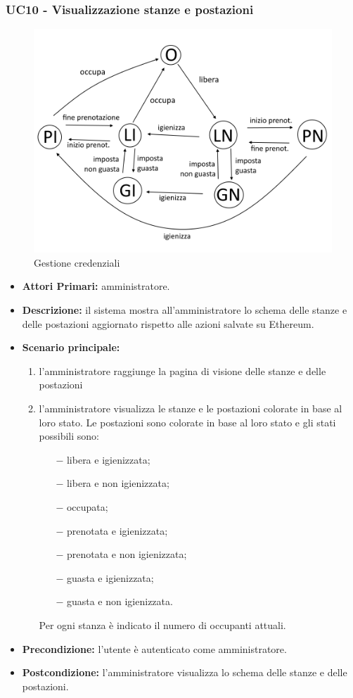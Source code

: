 \subsubsection{ UC10 - Visualizzazione stanze e postazioni}
\begin{figure}[H]
	\centering
	\includegraphics[width=15cm]{res/images/UC10.png}
	\caption{Gestione credenziali}
	\label{fig:stati postazioni}
\end{figure}
\begin{itemize}
	\item\textbf{Attori Primari:}
	amministratore.
	\item\textbf{Descrizione:}
	il sistema mostra all'amministratore lo schema delle stanze e delle postazioni aggiornato rispetto alle azioni salvate su Ethereum.
	\item\textbf{Scenario principale:}
	\begin{enumerate}
		\item l'amministratore raggiunge la pagina di visione delle stanze e delle postazioni
		\item l'amministratore visualizza le stanze e le postazioni colorate in base al loro stato. Le postazioni sono colorate in base al loro stato e gli stati possibili sono:
		\begin{itemize}
			\item[$-$] libera e igienizzata;
			\item[$-$] libera e non igienizzata;
			\item[$-$] occupata;
			\item[$-$] prenotata e igienizzata;
			\item[$-$] prenotata e non igienizzata;
			\item[$-$] guasta e igienizzata;
			\item[$-$] guasta e non igienizzata.
		\end{itemize}
		Per ogni stanza è indicato il numero di occupanti attuali.
	\end{enumerate}
	\item\textbf{Precondizione:} 
	l'utente è autenticato come amministratore.
	\item\textbf{Postcondizione:}
	l'amministratore visualizza lo schema delle stanze e delle postazioni.
\end{itemize}


